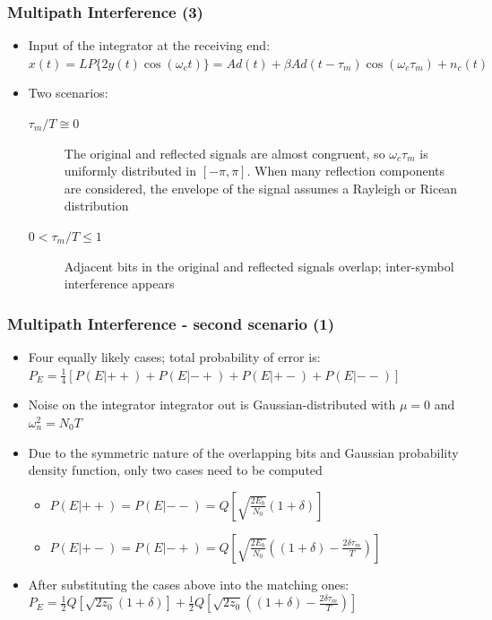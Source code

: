 \documentclass{beamer}
\begin{document}
\begin{frame}
	\frametitle{Multipath Interference (3)}
	\begin{itemize}
		\item Input of the integrator at the receiving end: $ x(t) = LP\{2y(t)\cos(\omega_c t)\} = Ad(t) + \beta Ad(t - \tau_m)\cos(\omega_c \tau_m) + n_c(t) $
		\item Two scenarios:
		\begin{description}
			\item[$ \tau_m/T \cong 0 $] The original and reflected signals are almost congruent, so $ \omega_c \tau_m $ is uniformly distributed in $ [-\pi, \pi] $. When many reflection components are considered, the envelope of the signal assumes a Rayleigh or Ricean distribution
			\item[$ 0 < \tau_m/T \leq 1 $] Adjacent bits in the original and reflected signals overlap; inter-symbol interference appears
		\end{description}
	\end{itemize}
\end{frame}

\begin{frame}
	\frametitle{Multipath Interference - second scenario (1)}
	\begin{itemize}
		\item Four equally likely cases; total probability of error is: $ P_E = \frac{1}{4}[P(E|++) + P(E|-+) + P(E|+-) + P(E|--)] $
		\item Noise on the integrator integrator out is Gaussian-distributed with $ \mu = 0 $ and $ \omega^2_n = N_0T $
		\item Due to the symmetric nature of the overlapping bits and Gaussian probability density function, only two cases need to be computed
		\begin{itemize}
			\item $ P(E|++) = P(E|--) = Q\left[\sqrt{\frac{2E_b}{N_0}}(1+\delta)\right] $
			\item $ P(E|+-) = P(E|-+) = Q\left[\sqrt{\frac{2E_b}{N_0}}\left((1+\delta) - \frac{2\delta\tau_m}{T}\right)\right] $
		\end{itemize}
		\item After substituting the cases above into the matching ones: $ P_E = \frac{1}{2}Q\left[\sqrt{2z_0}(1+\delta)\right] + \frac{1}{2}Q\left[\sqrt{2z_0}\left((1+\delta) - \frac{2\delta\tau_m}{T}\right)\right] $
	\end{itemize}
\end{frame}
\end{document}
